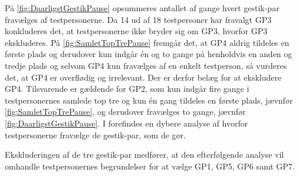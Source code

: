På \autoref{fig:DaarligstGestikPause} opsummeres antallet af gange hvert gestik-par fravælges af testpersonerne. Da 14 ud af 18 testpersoner har fravalgt GP3 konkluderes det, at testpersonerne ikke bryder sig om GP3, hvorfor GP3 ekskluderes. På \autoref{fig:SamletTopTrePause} fremgår det, at GP4 aldrig tildeles en første plads og derudover kun indgår én og to gange på henholdvis en anden og tredje plads og selvom GP4 kun fravælges af en enkelt testperson, så vurderes det, at GP4 er overflødig og irrelevant. Der er derfor belæg for at ekskludere GP4. Tilsvarende er gældende for GP2, som kun indgår fire gange i testpersonernes samlede top tre og kun én gang tildeles en første plads, jævnfør \autoref{fig:SamletTopTrePause}, og derudover fravælges to gange, jævnfør \autoref{fig:DaarligstGestikPause}. I  forefindes en dybere analyse af hvorfor testpersonerne fravælge de gestik-par, som de gør.

Ekskluderingen af de tre gestik-par medfører, at den efterfølgende analyse vil omhandle testpersonernes begrundelser for at vælge GP1, GP5, GP6 samt GP7.
%
